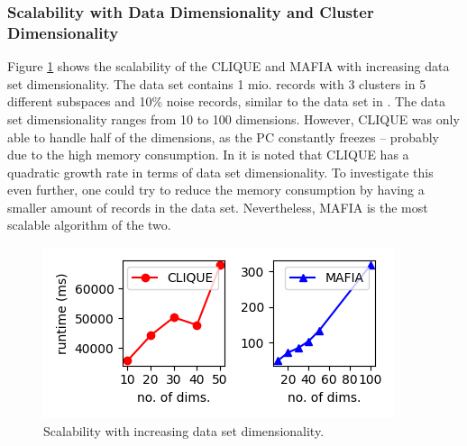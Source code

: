 \subsubsection{Scalability with Data Dimensionality and Cluster Dimensionality}
Figure \ref{fig:data_dimensionality_vs_runtime} shows the scalability of the CLIQUE and MAFIA with increasing data set dimensionality. The data set contains 1 mio. records with 3 clusters in 5 different subspaces and 10\% noise records, similar to the data set in \cite{mafia}. The data set dimensionality ranges from 10 to 100 dimensions. However, CLIQUE was only able to handle half of the dimensions, as the PC constantly freezes -- probably due to the high memory consumption. In \cite{clique} it is noted that CLIQUE has a quadratic growth rate in terms of data set dimensionality. To investigate this even further, one could try to reduce the memory consumption by having a smaller amount of records in the data set. Nevertheless, MAFIA is the most scalable algorithm of the two.
\begin{figure}[H]
    \vspace*{-0.5cm}
    \centering
    \includegraphics[scale=0.45]{figures/data_dimensionality_vs_runtime.png}
    \caption{Scalability with increasing data set dimensionality.}
    \label{fig:data_dimensionality_vs_runtime}
    \vspace*{-0.5cm}
\end{figure}

